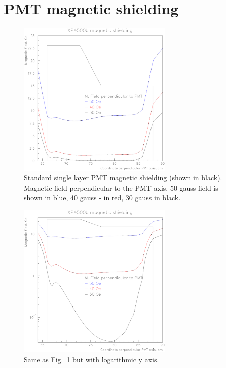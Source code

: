 \documentclass[11pt,titlepage]{article}
\begin{document}
\section{PMT magnetic shielding}
 \begin{figure}
 \hspace{0.5cm}
 \begin{centering}
  \includegraphics[height=7.5cm]{shield_r_lin.eps}
 \vspace{0.5cm}
 \caption{\label{lin_r}
Standard single layer PMT magnetic shielding (shown in black).
Magnetic field perpendicular to the PMT axis.
50 gauss field is shown in blue, 40 gauss - in red, 30 gauss in black.
}
\end{centering}
 \end{figure}
 \begin{figure}
 \hspace{0.5cm}
 \begin{centering}
  \includegraphics[height=7.5cm]{shield_r_log.eps}
 \vspace{0.5cm}
 \caption{\label{log_r}
Same as Fig.~\ref{lin_r} but with logarithmic y axis.}
\end{centering}
 \end{figure}
\end{document}
